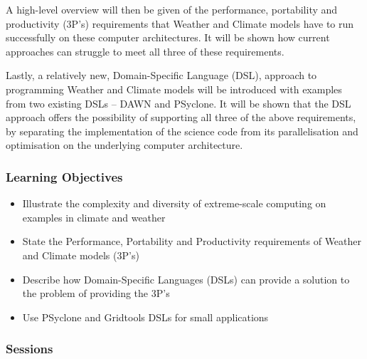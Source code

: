 A high-level overview will then be given of the performance, portability and productivity (3P's) requirements that Weather and Climate models have to run successfully on these computer architectures. It will be shown how current approaches can struggle to meet all three of these requirements.

Lastly, a relatively new, Domain-Specific Language (DSL), approach to programming Weather and Climate models will be introduced with examples from two existing DSLs -- DAWN and PSyclone. It will be shown that the DSL approach offers the possibility of supporting all three of the above requirements, by separating the implementation of the science code from its parallelisation and optimisation on the underlying computer architecture.

\subsubsection{Learning Objectives}

\begin{itemize}

\item Illustrate the complexity and diversity of extreme-scale computing on examples in climate and weather
\item State the Performance, Portability and Productivity requirements of Weather and Climate models (3P's)
\item Describe how Domain-Specific Languages (DSLs) can provide a solution to the problem of providing the 3P's
\item Use PSyclone and Gridtools DSLs for small applications

\end{itemize}

\subsubsection{Sessions}

